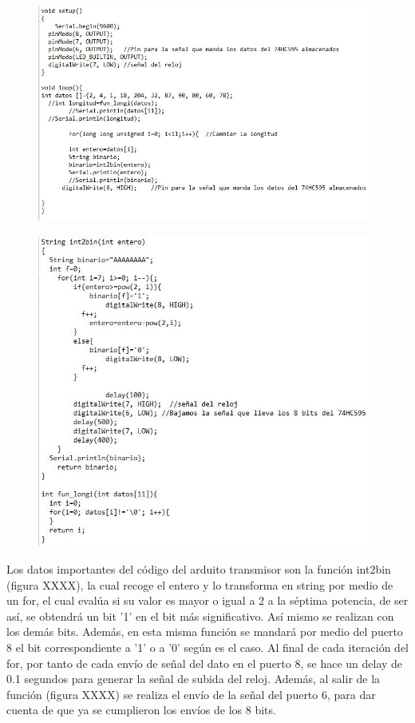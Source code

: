 \documentclass{article}
\begin{document}
\begin{figure}[h]
\includegraphics[width=11cm]{Transmisor1.JPG}
\centering
\caption{}
\label{fig:codigo_transmisor_1.PNG}
\end{figure}


\begin{figure}[h]
\includegraphics[width=11cm]{Transmisor2.JPG}
\centering
\caption{}
\label{fig:codigo_transmisor_2.PNG}
\end{figure}

Los datos importantes del código del arduito transmisor son la función int2bin (figura XXXX), la cual recoge el entero y lo transforma en string por medio de un for, el cual evalúa si su valor es mayor o igual a 2 a la séptima potencia, de ser así, se obtendrá un bit '1' en el bit más significativo. Así mismo se realizan con los demás bits. Además, en esta misma función se mandará por medio del puerto 8 el bit correspondiente a '1' o a '0' según es el caso. Al final de cada iteración del for, por tanto de cada envío de señal del dato en el puerto 8, se hace un delay de 0.1 segundos para generar la señal de subida del reloj. Además, al salir de la función (figura XXXX) se realiza el envío de la señal del puerto 6, para dar cuenta de que ya se cumplieron los envíos de los 8 bits.\\
\end{document}
